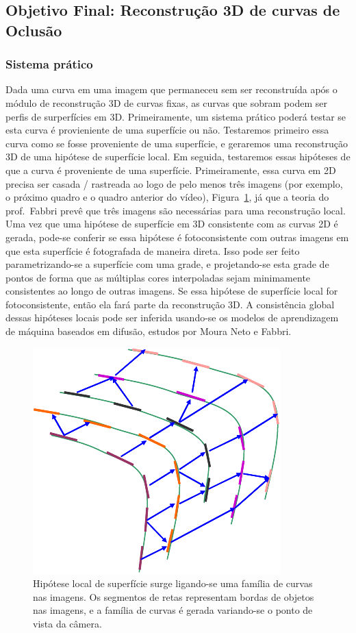 \documentclass[a4paper,titlepage]{article}
\begin{document}
\subsection{Objetivo Final: Reconstrução 3D de curvas de Oclusão}

\subsubsection{Sistema prático}
Dada uma curva em uma imagem que permaneceu sem ser reconstruída após o módulo
de reconstrução 3D de curvas fixas,
as curvas que sobram podem ser perfis de surperfícies em 3D. Primeiramente, um
sistema prático poderá testar se esta curva é provieniente de uma superfície ou
não.
Testaremos primeiro essa curva como se fosse proveniente de uma superfície, e
geraremos uma reconstrução 3D de uma hipótese de superfície local. Em seguida,
testaremos essas hipóteses de que a curva é proveniente de uma superfície.
Primeiramente, essa curva em 2D precisa ser casada / rastreada ao logo de pelo
menos três imagens (por exemplo, o próximo quadro e o quadro anterior do
vídeo), Figura~\ref{fig:vj}, já que a teoria do prof.\ Fabbri prevê que três imagens são necessárias
para uma reconstrução local. Uma vez que uma hipótese de superfície em 3D
consistente com as curvas 2D é gerada, pode-se conferir se essa hipótese é
fotoconsistente com outras imagens em que esta superfície é fotografada de
maneira direta. Isso pode ser feito parametrizando-se a superfície com uma
grade, e projetando-se esta grade de pontos de forma que as múltiplas cores
interpoladas sejam minimamente consistentes ao longo de outras imagens.
Se essa hipótese de superfície local for fotoconsistente, então ela fará parte
da reconstrução 3D. A consistência global dessas hipóteses locais pode ser
inferida usando-se os modelos de aprendizagem de máquina baseados em difusão,
estudos por Moura Neto e Fabbri. 
\begin{figure}
\centering
\includegraphics[scale=1]{figs/dynamic_curve_fragment-eps-converted-to.pdf}
\caption{
Hipótese local de superfície surge ligando-se uma família de curvas nas imagens.
Os segmentos de retas representam bordas de objetos nas imagens, e a família de
curvas é gerada variando-se o ponto de vista da câmera.
}
\label{fig:vj}
\end{figure}
\end{document}
